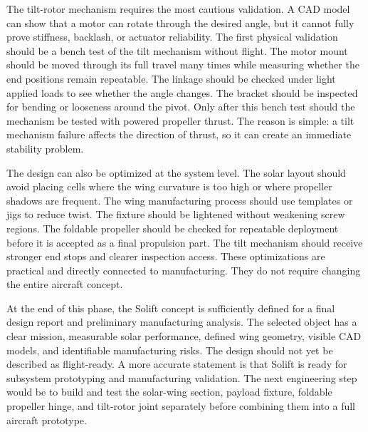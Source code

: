 The tilt-rotor mechanism requires the most cautious validation. A CAD model can show that a motor can rotate through the desired angle, but it cannot fully prove stiffness, backlash, or actuator reliability. The first physical validation should be a bench test of the tilt mechanism without flight. The motor mount should be moved through its full travel many times while measuring whether the end positions remain repeatable. The linkage should be checked under light applied loads to see whether the angle changes. The bracket should be inspected for bending or looseness around the pivot. Only after this bench test should the mechanism be tested with powered propeller thrust. The reason is simple: a tilt mechanism failure affects the direction of thrust, so it can create an immediate stability problem.

The design can also be optimized at the system level. The solar layout should avoid placing cells where the wing curvature is too high or where propeller shadows are frequent. The wing manufacturing process should use templates or jigs to reduce twist. The fixture should be lightened without weakening screw regions. The foldable propeller should be checked for repeatable deployment before it is accepted as a final propulsion part. The tilt mechanism should receive stronger end stops and clearer inspection access. These optimizations are practical and directly connected to manufacturing. They do not require changing the entire aircraft concept.

At the end of this phase, the Solift concept is sufficiently defined for a final design report and preliminary manufacturing analysis. The selected object has a clear mission, measurable solar performance, defined wing geometry, visible CAD models, and identifiable manufacturing risks. The design should not yet be described as flight-ready. A more accurate statement is that Solift is ready for subsystem prototyping and manufacturing validation. The next engineering step would be to build and test the solar-wing section, payload fixture, foldable propeller hinge, and tilt-rotor joint separately before combining them into a full aircraft prototype.

